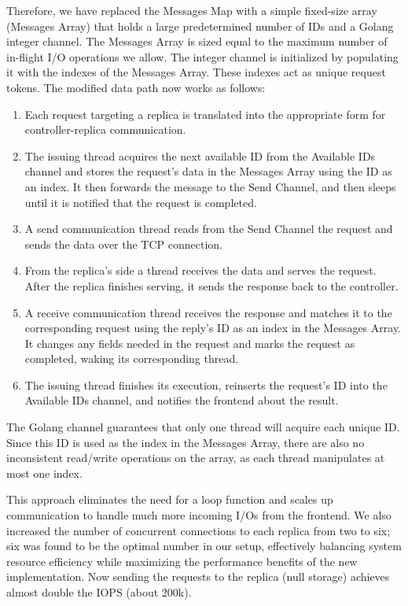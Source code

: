Therefore, we have replaced the Messages Map with a simple fixed-size array (Messages Array) that holds a large predetermined number of IDs and a Golang integer channel. The Messages Array is sized equal to the maximum number of in-flight I/O operations we allow. The integer channel is initialized by populating it with the indexes of the Messages Array. These indexes act as unique request tokens. The modified data path now works as follows:

\begin{enumerate}
\item Each request targeting a replica is translated into the appropriate form for controller-replica communication.
\item The issuing thread acquires the next available ID from the Available IDs channel and stores the request's data in the Messages Array using the ID as an index. It then forwards the message to the Send Channel, and then sleeps until it is notified that the request is completed.
\item A send communication thread reads from the Send Channel the request and sends the data over the TCP connection.
\item From the replica's side a thread receives the data and serves the request. After the replica finishes serving, it sends the response back to the controller.
\item A receive communication thread receives the response and matches it to the corresponding request using the reply's ID as an index in the Messages Array. It changes any fields needed in the request and marks the request as completed, waking its corresponding thread.
\item The issuing thread finishes its execution, reinserts the request's ID into the Available IDs channel, and notifies the frontend about the result.
\end{enumerate}

The Golang channel guarantees that only one thread will acquire each unique ID. Since this ID is used as the index in the Messages Array, there are also no inconsistent read/write operations on the array, as each thread manipulates at most one index.

This approach eliminates the need for a loop function and scales up communication to handle much more incoming I/Os from the frontend. We also increased the number of concurrent connections to each replica from two to six; six was found to be the optimal number in our setup, effectively balancing system resource efficiency while maximizing the performance benefits of the new implementation. Now sending the requests to the replica (null storage) achieves almost double the IOPS (about 200k).

